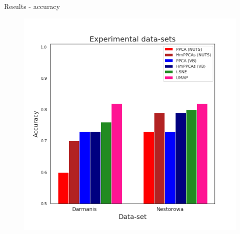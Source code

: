 \documentclass{beamer}
\begin{document}
\begin{frame}{Results - accuracy}
    \begin{figure}
        \centering
        \includegraphics[width=0.6\linewidth]{Splatter_Accuracy_exp.png}
    \end{figure}
\end{frame}
\end{document}
